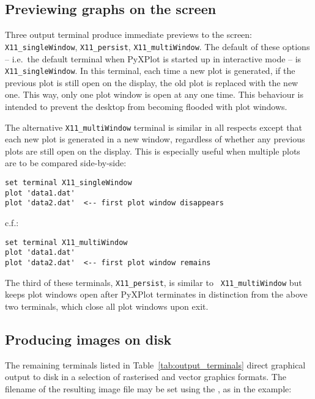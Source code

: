 \subsection{Previewing graphs on the screen}

Three output terminal produce immediate previews to the screen: {\tt
X11\_\-single\-Window}, {\tt X11\_\-persist}, {\tt X11\_\-multi\-Window}.  The
default of these options -- i.e.\ the default terminal when PyXPlot is started
up in interactive mode -- is {\tt X11\_\-single\-Window}.  In this terminal,
each time a new plot is generated, if the previous plot is still open on the
display, the old plot is replaced with the new one. This way, only one plot
window is open at any one time. This behaviour is intended to prevent the
desktop from becoming flooded with plot windows.

The alternative {\tt X11\_\-multi\-Window} terminal is similar in all respects
except that each new plot is generated in a new window, regardless of whether
any previous plots are still open on the display. This is especially useful
when multiple plots are to be compared side-by-side:

\begin{verbatim}
set terminal X11_singleWindow
plot 'data1.dat'
plot 'data2.dat'  <-- first plot window disappears
\end{verbatim}

\noindent c.f.:

\begin{verbatim}
set terminal X11_multiWindow
plot 'data1.dat'
plot 'data2.dat'  <-- first plot window remains
\end{verbatim}

The third of these terminals, {\tt X11\_\-persist}, is similar to {\tt
X11\_\-multi\-Window} but keeps plot windows open after PyXPlot terminates in
distinction from the above two terminals, which close all plot windows upon
exit.

\subsection{Producing images on disk}

The remaining terminals listed in Table~\ref{tab:output_terminals} direct
graphical output to disk in a selection of rasterised and vector graphics
formats. The filename of the resulting image file may be set using the
, as in the example:

